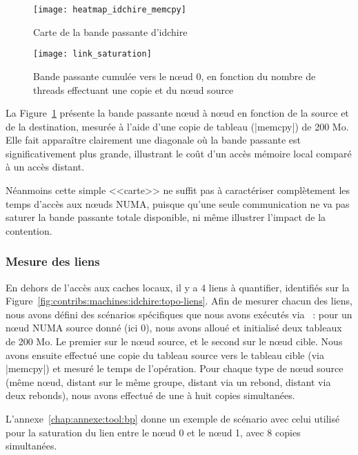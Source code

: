 \begin{figure}[t!]
  \centering
  \texttt{[image: heatmap\_idchire\_memcpy]}
  \caption{Carte de la bande passante d'idchire}\label{fig:contribs:machines:idchire:heatmap}
\end{figure}

\begin{figure}[h!]
  \centering
  \texttt{[image: link\_saturation]}
  \caption{Bande passante cumulée vers le nœud 0, en fonction du nombre de threads effectuant une copie et du nœud source}\label{fig:contribs:machines:idchire:saturation}
\end{figure}


La Figure~\ref{fig:contribs:machines:idchire:heatmap} présente la bande passante nœud à nœud en fonction de la source et de la destination, mesurée à l'aide d'une copie de tableau (|memcpy|) de 200 Mo.
Elle fait apparaître clairement une diagonale où la bande passante est significativement plus grande, illustrant le coût d'un accès mémoire local comparé à un accès distant.

Néanmoins cette simple <<carte>> ne suffit pas à caractériser complètement les temps d'accès aux nœuds NUMA, puisque qu'une seule communication ne va pas saturer la bande passante totale disponible, ni même illustrer l'impact de la contention.


\subsubsection{Mesure des liens}\label{sec:contribs:machines:idchire:liens}

En dehors de l'accès aux caches locaux, il y a 4 liens à quantifier, identifiés sur la Figure~\ref{fig:contribs:machines:idchire:topo-liens}.
Afin de mesurer chacun des liens, nous avons défini des scénarios spécifiques que nous avons exécutés via \outil~: pour un nœud NUMA source donné (ici 0), nous avons alloué et initialisé deux tableaux de 200 Mo. Le premier sur le nœud source, et le second sur le nœud cible. Nous avons ensuite effectué une copie du tableau source vers le tableau cible (via |memcpy|) et mesuré le temps de l'opération.
Pour chaque type de nœud source (même nœud, distant sur le même groupe, distant via un rebond, distant via deux rebonds), nous avons effectué de une à huit copies simultanées.

L'annexe~\ref{chap:annexe:tool:bp} donne un exemple de scénario avec celui utilisé pour la saturation du lien entre le nœud 0 et le nœud 1, avec 8 copies simultanées.

